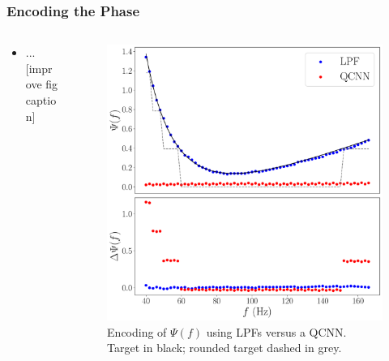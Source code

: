 \documentclass{beamer}
\begin{document}
\begin{frame}
\frametitle{Encoding the Phase}
\begin{columns}
\begin{column}{0.5\textwidth}
\begin{itemize}
\item ... [improve fig caption]
\end{itemize}
\end{column}
\begin{column}{0.5\textwidth}  
\begin{figure}[h]
\centering
\includegraphics[width=\textwidth]{im/phase_comp}
\caption{Encoding of $\Psi(f)$ using LPFs versus a QCNN. Target in black; rounded target dashed in grey.}
\end{figure}
\end{column}
\end{columns}
\end{frame}
\end{document}
